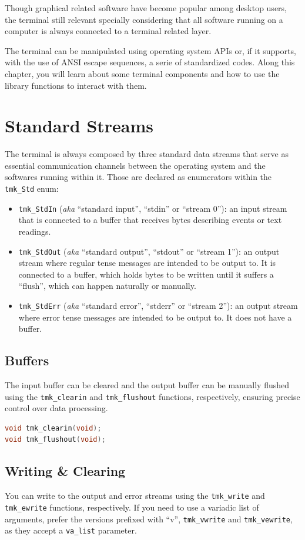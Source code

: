 \documentclass{report}
\begin{document}
Though graphical related software have become popular among desktop users, the terminal still relevant specially considering that all software running on a computer is always connected to a terminal related layer.

The terminal can be manipulated using operating system APIs or, if it supports, with the use of ANSI escape sequences, a serie of standardized codes. Along this chapter, you will learn about some terminal components and how to use the library functions to interact with them.
\section{Standard Streams}
The terminal is always composed by three standard data streams that serve as essential communication channels between the operating system and the softwares running within it. Those are declared as enumerators within the \texttt{tmk\_Std} enum:
\begin{itemize}
  \item \texttt{tmk\_StdIn} (\textit{aka} ``standard input'', ``stdin'' or ``stream 0''): an input stream that is connected to a buffer that receives bytes describing events or text readings.
  \item \texttt{tmk\_StdOut} (\textit{aka} ``standard output'', ``stdout'' or ``stream 1''): an output stream where regular tense messages are intended to be output to. It is connected to a buffer, which holds bytes to be written until it suffers a ``flush'', which can happen naturally or manually.
  \item \texttt{tmk\_StdErr} (\textit{aka} ``standard error'', ``stderr'' or ``stream 2''): an output stream where error tense messages are intended to be output to. It does not have a buffer.
\end{itemize}
\subsection{Buffers}
The input buffer can be cleared and the output buffer can be manually flushed using the \texttt{tmk\_clearin} and \texttt{tmk\_flushout} functions, respectively, ensuring precise control over data processing.
\begin{lstlisting}[language=c,caption=the declarations of the \texttt{tmk\_clearin} and \texttt{tmk\_flushout} functions.]
void tmk_clearin(void);
void tmk_flushout(void);
\end{lstlisting}
\subsection{Writing \& Clearing}
You can write to the output and error streams using the \texttt{tmk\_write} and \texttt{tmk\_ewrite} functions, respectively. If you need to use a variadic list of arguments, prefer the versions prefixed with ``v'', \texttt{tmk\_vwrite} and \texttt{tmk\_vewrite}, as they accept a \texttt{va\_list} parameter.
\end{document}
